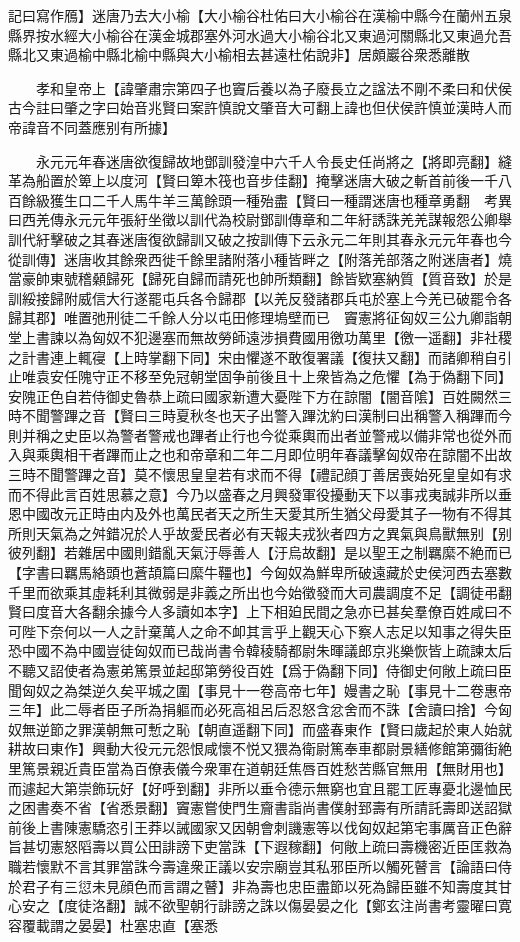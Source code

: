 記曰寫作鴈】迷唐乃去大小榆【大小榆谷杜佑曰大小榆谷在漢榆中縣今在蘭州五泉縣界按水經大小榆谷在漢金城郡塞外河水過大小榆谷北又東過河關縣北又東過允吾縣北又東過榆中縣北榆中縣與大小榆相去甚遠杜佑說非】居頗巖谷衆悉離散

　　孝和皇帝上【諱肇肅宗第四子也竇后養以為子廢長立之諡法不剛不柔曰和伏侯古今註曰肇之字曰始音兆賢曰案許慎說文肇音大可翻上諱也但伏侯許慎並漢時人而帝諱音不同蓋應别有所據】

　　永元元年春迷唐欲復歸故地鄧訓發湟中六千人令長史任尚將之【將即亮翻】縫革為船置於箄上以度河【賢曰箄木筏也音步佳翻】掩擊迷唐大破之斬首前後一千八百餘級獲生口二千人馬牛羊三萬餘頭一種殆盡【賢曰一種謂迷唐也種章勇翻　考異曰西羌傳永元元年張紆坐徵以訓代為校尉鄧訓傳章和二年紆誘誅羌羌謀報怨公卿舉訓代紆擊破之其春迷唐復欲歸訓又破之按訓傳下云永元二年則其春永元元年春也今從訓傳】迷唐收其餘衆西徙千餘里諸附落小種皆畔之【附落羌部落之附迷唐者】燒當豪帥東號稽顙歸死【歸死自歸而請死也帥所類翻】餘皆欵塞納質【質音致】於是訓綏接歸附威信大行遂罷屯兵各令歸郡【以羌反發諸郡兵屯於塞上今羌已破罷令各歸其郡】唯置弛刑徒二千餘人分以屯田修理塢壁而已　竇憲將征匈奴三公九卿詣朝堂上書諫以為匈奴不犯邊塞而無故勞師遠涉損費國用徼功萬里【徼一遥翻】非社稷之計書連上輒寑【上時掌翻下同】宋由懼遂不敢復署議【復扶又翻】而諸卿稍自引止唯袁安任隗守正不移至免冠朝堂固争前後且十上衆皆為之危懼【為于偽翻下同】安隗正色自若侍御史魯恭上疏曰國家新遭大憂陛下方在諒闇【闇音隂】百姓闕然三時不聞警蹕之音【賢曰三時夏秋冬也天子出警入蹕沈約曰漢制曰出稱警入稱蹕而今則并稱之史臣以為警者警戒也蹕者止行也今從乘輿而出者並警戒以備非常也從外而入與乘輿相干者蹕而止之也和帝章和二年二月即位明年春議擊匈奴帝在諒闇不出故三時不聞警蹕之音】莫不懷思皇皇若有求而不得【禮記顔丁善居喪始死皇皇如有求而不得此言百姓思慕之意】今乃以盛春之月興發軍役擾動天下以事戎夷誠非所以垂恩中國改元正時由内及外也萬民者天之所生天愛其所生猶父母愛其子一物有不得其所則天氣為之舛錯况於人乎故愛民者必有天報夫戎狄者四方之異氣與鳥獸無别【别彼列翻】若雜居中國則錯亂天氣汙辱善人【汙烏故翻】是以聖王之制羈縻不絶而已【字書曰羈馬絡頭也蒼頡篇曰縻牛韁也】今匈奴為鮮卑所破遠藏於史侯河西去塞數千里而欲乘其虛耗利其微弱是非義之所出也今始徵發而大司農調度不足【調徒弔翻賢曰度音大各翻余據今人多讀如本字】上下相廹民間之急亦已甚矣羣僚百姓咸曰不可陛下奈何以一人之計棄萬人之命不卹其言乎上觀天心下察人志足以知事之得失臣恐中國不為中國豈徒匈奴而已哉尚書令韓稜騎都尉朱暉議郎京兆樂恢皆上疏諫太后不聽又詔使者為憲弟篤景並起邸第勞役百姓【爲于偽翻下同】侍御史何敞上疏曰臣聞匈奴之為桀逆久矣平城之圍【事見十一卷高帝七年】嫚書之恥【事見十二卷惠帝三年】此二辱者臣子所為捐軀而必死高祖呂后忍怒含忿舍而不誅【舍讀曰捨】今匈奴無逆節之罪漢朝無可慙之恥【朝直遥翻下同】而盛春東作【賢曰歲起於東人始就耕故曰東作】興動大役元元怨恨咸懷不悦又猥為衛尉篤奉車都尉景繕修館第彌街絶里篤景親近貴臣當為百僚表儀今衆軍在道朝廷焦唇百姓愁苦縣官無用【無財用也】而遽起大第崇飾玩好【好呼到翻】非所以垂令德示無窮也宜且罷工匠專憂北邊恤民之困書奏不省【省悉景翻】竇憲嘗使門生齎書詣尚書僕射郅壽有所請託壽即送詔獄前後上書陳憲驕恣引王莽以誡國家又因朝會刺譏憲等以伐匈奴起第宅事厲音正色辭旨甚切憲怒䧟壽以買公田誹謗下吏當誅【下遐稼翻】何敞上疏曰壽機密近臣匡救為職若懷默不言其罪當誅今壽違衆正議以安宗廟豈其私邪臣所以觸死瞽言【論語曰侍於君子有三愆未見顔色而言謂之瞽】非為壽也忠臣盡節以死為歸臣雖不知壽度其甘心安之【度徒洛翻】誠不欲聖朝行誹謗之誅以傷晏晏之化【鄭玄注尚書考靈曜曰寛容覆載謂之晏晏】杜塞忠直【塞悉